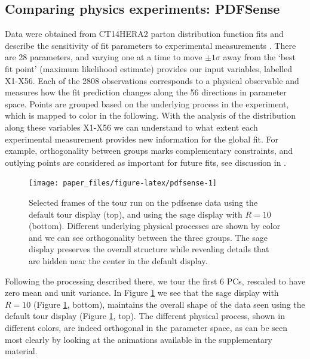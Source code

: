 \documentclass[]{interact}
\theoremstyle{plain}%
\theoremstyle{definition}
\theoremstyle{remark}
\begin{document}
\hypertarget{sec:appl3}{%
\subsection{Comparing physics experiments: PDFSense}\label{sec:appl3}}

Data were obtained from CT14HERA2 parton distribution function fits and
describe the sensitivity of fit parameters to experimental measurements
\citep{Wang:2018heo}. There are 28 parameters, and varying one at a time
to move \(\pm 1 \sigma\) away from the `best fit point' (maximum
likelihood estimate) provides our input variables, labelled X1-X56. Each
of the 2808 observations corresponds to a physical observable and
measures how the fit prediction changes along the 56 directions in
parameter space. Points are grouped based on the underlying process in
the experiment, which is mapped to color in the following. With the
analysis of the distribution along these variables X1-X56 we can
understand to what extent each experimental measurement provides new
information for the global fit. For example, orthogonality between
groups marks complementary constraints, and outlying points are
considered as important for future fits, see discussion in
\citet{Cook:2018mvr}.

\begin{figure}

{\centering \texttt{[image: paper\_files/figure-latex/pdfsense-1]} 

}

\caption{Selected frames of the tour run on the pdfsense data using the default tour display (top), and using the sage display with $R=10$ (bottom). Different underlying physical processes are shown by color and we can see orthogonality between the three groups. The sage display preserves the overall structure while revealing details that are hidden near the center in the default display.}\label{fig:pdfsense}
\end{figure}

Following the processing described there, we tour the first 6 PCs,
rescaled to have zero mean and unit variance. In Figure
\ref{fig:pdfsense} we see that the sage display with \(R = 10\) (Figure
\ref{fig:pdfsense}, bottom), maintains the overall shape of the data
seen using the default tour display (Figure \ref{fig:pdfsense}, top).
The different physical process, shown in different colors, are indeed
orthogonal in the parameter space, as can be seen most clearly by
looking at the animations available in the supplementary material.
\end{document}
